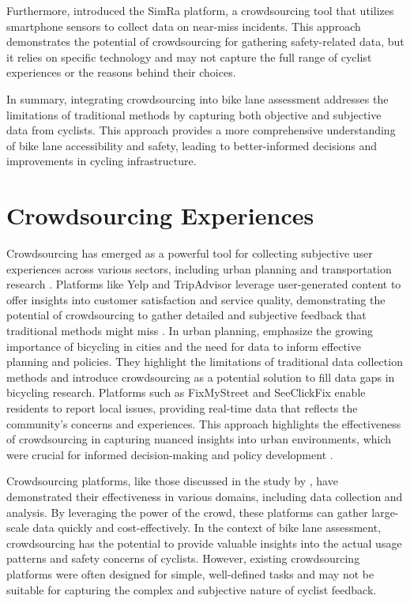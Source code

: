 Furthermore, \citet{Karakaya:2020} introduced the SimRa platform, a crowdsourcing tool that utilizes smartphone sensors to collect data on near-miss incidents. This approach demonstrates the potential of crowdsourcing for gathering safety-related data, but it relies on specific technology and may not capture the full range of cyclist experiences or the reasons behind their choices.

In summary, integrating crowdsourcing into bike lane assessment addresses the limitations of traditional methods by capturing both objective and subjective data from cyclists. This approach provides a more comprehensive understanding of bike lane accessibility and safety, leading to better-informed decisions and improvements in cycling infrastructure.


\section{Crowdsourcing Experiences}

Crowdsourcing has emerged as a powerful tool for collecting subjective user experiences across various sectors, including urban planning and transportation research \citep{Epifantsev:2024, Misra:2014}. Platforms like Yelp and TripAdvisor leverage user-generated content to offer insights into customer satisfaction and service quality, demonstrating the potential of crowdsourcing to gather detailed and subjective feedback that traditional methods might miss \citet{Epifantsev:2024}. In urban planning, \citet{Nelson:2020} emphasize the growing importance of bicycling in cities and the need for data to inform effective planning and policies. They highlight the limitations of traditional data collection methods and introduce crowdsourcing as a potential solution to fill data gaps in bicycling research. Platforms such as FixMyStreet and SeeClickFix enable residents to report local issues, providing real-time data that reflects the community's concerns and experiences. This approach highlights the effectiveness of crowdsourcing in capturing nuanced insights into urban environments, which were crucial for informed decision-making and policy development \citep{Misra:2014}.

Crowdsourcing platforms, like those discussed in the study by \citet{Cheng:2018}, have demonstrated their effectiveness in various domains, including data collection and analysis. By leveraging the power of the crowd, these platforms can gather large-scale data quickly and cost-effectively. In the context of bike lane assessment, crowdsourcing has the potential to provide valuable insights into the actual usage patterns and safety concerns of cyclists. However, existing crowdsourcing platforms were often designed for simple, well-defined tasks and may not be suitable for capturing the complex and subjective nature of cyclist feedback.

